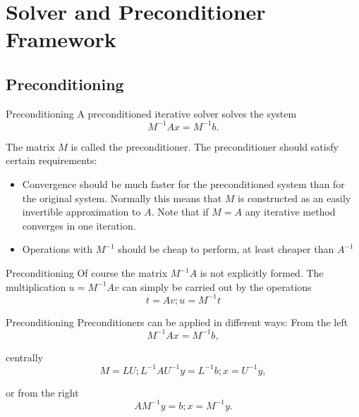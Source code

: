 \section{Solver and Preconditioner Framework}

\subsection{Preconditioning}
\begin{frame}{Preconditioning}
  A preconditioned iterative solver solves the system
  \begin{equation}
    M^{-1} A x = M^{-1}b .
  \end{equation}

The matrix $M$ is called the preconditioner.
The preconditioner should satisfy certain requirements:
\begin{itemize}
\item Convergence should be much faster for the preconditioned
system than for the original system. Normally this means
that $M$ is constructed as an easily invertible approximation
to $A$. Note that if $M = A$ any iterative method converges in
one iteration.
\item Operations with $M^{-1}$ should be cheap to perform, at least
  cheaper than $A^{-1}$

\end{itemize}
\end{frame}

\begin{frame}{Preconditioning}
  Of course the matrix $M^{-1}A$ is not explicitly formed. The
multiplication $u = M^{-1}Av$ can simply be carried out by the
operations
\begin{equation*}
t = Av; u = M^{-1}t
\end{equation*}

\end{frame}

\begin{frame}{Preconditioning}
  Preconditioners can be applied in different ways:
  From the left
  \begin{equation*}
    M^{-1}Ax = M^{-1}b ,
  \end{equation*}

  centrally
  \begin{equation*}
M = LU; L^{-1}AU^{-1}y = L^{-1}b; x = U^{-1}y ,
  \end{equation*}

  or from the right
  \begin{equation*}
    AM^{-1}y = b; x = M^{-1}y .
  \end{equation*}

\end{frame}

